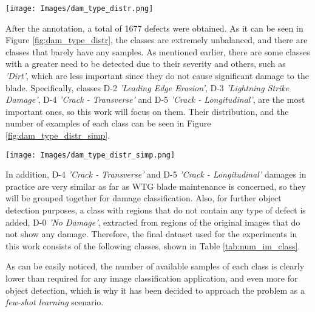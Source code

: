 \begin{figure*}[htbp]
        \centering            
        \texttt{[image: Images/dam\_type\_distr.png]}
        \caption[Damage type distribution. All possible defects/classes.]
        {\small Damage type distribution. All possible defects/classes.} 
        \label{fig:dam_type_distr}
    \end{figure*}

After the annotation, a total of 1677 defects were obtained. As it can be seen in Figure \ref{fig:dam_type_distr}, the classes are extremely unbalanced, and there are classes that barely have any samples. As mentioned earlier, there are some classes with a greater need to be detected due to their severity and others, such as \emph{'Dirt'}, which are less important since they do not cause significant damage to the blade. Specifically, classes D-2 \emph{'Leading Edge Erosion'}, D-3 \emph{'Lightning Strike Damage'}, D-4 \emph{'Crack - Transverse'} and D-5 \emph{'Crack - Longitudinal'}, are the most important ones, so this work will focus on them. Their distribution, and the number of examples of each class can be seen in Figure \ref{fig:dam_type_distr_simp}.

\begin{figure*}[htbp]
        \centering            
        \texttt{[image: Images/dam\_type\_distr\_simp.png]}
        \caption[Damage type distribution. Considered defects/classes.]
        {\small Damage type distribution. Considered defects/classes.} 
        \label{fig:dam_type_distr_simp}
    \end{figure*}

In addition, D-4 \emph{'Crack - Transverse'} and D-5 \emph{'Crack - Longitudinal'} damages in practice are very similar as far as WTG blade maintenance is concerned, so they will be grouped together for damage classification. Also, for further object detection purposes, a class with regions that do not contain any type of defect is added, D-0 \emph{'No Damage'}, extracted from regions of the original images that do not show any damage. Therefore, the final dataset used for the experiments in this work consists of the following classes, shown in Table \ref{tab:num_im_class}.

As can be easily noticed, the number of available samples of each class is clearly lower than required for any image classification application, and even more for object detection, which is why it has been decided to approach the problem as a \emph{few-shot learning} scenario.

